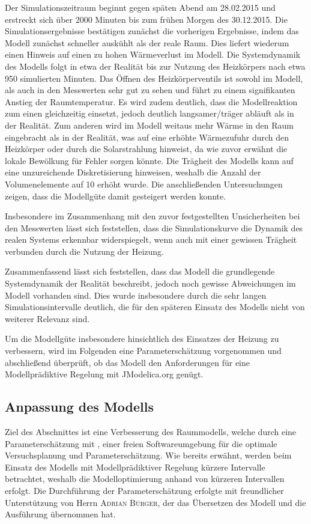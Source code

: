 Der Simulationszeitraum beginnt gegen späten Abend am 28.02.2015 und erstreckt sich über 2000 Minuten bis zum frühen Morgen des 30.12.2015. Die Simulationsergebnisse bestätigen zunächst die vorherigen Ergebnisse, indem das Modell zunächst schneller auskühlt als der reale Raum. Dies liefert wiederum einen Hinweis auf einen zu hohen Wärmeverlust im Modell.
Die Systemdynamik des Modells folgt in etwa der Realität bis zur Nutzung des Heizkörpers nach etwa 950 simulierten Minuten. 
Das Öffnen des Heizkörperventils ist sowohl im Modell, als auch in den Messwerten sehr gut zu sehen und führt zu einem signifikanten Anstieg der Raumtemperatur. Es wird zudem deutlich, dass die Modellreaktion zum einen gleichzeitig einsetzt, jedoch deutlich langsamer/träger abläuft als in der Realität. Zum anderen wird im Modell weitaus mehr Wärme in den Raum eingebracht als in der Realität, was auf eine erhöhte Wärmezufuhr durch den Heizkörper oder durch die Solarstrahlung hinweist, da wie zuvor erwähnt die lokale Bewölkung für Fehler sorgen könnte.
Die Trägheit des Modells kann auf eine unzureichende Diskretisierung hinweisen, weshalb die Anzahl der Volumenelemente auf 10 erhöht wurde. Die anschließenden Untersuchungen zeigen, dass die Modellgüte damit gesteigert werden konnte.

Insbesondere im Zusammenhang mit den zuvor festgestellten Unsicherheiten bei den Messwerten lässt sich feststellen, dass die  Simulationskurve die Dynamik des realen Systems erkennbar widerspiegelt, wenn auch mit einer gewissen Trägheit verbunden durch die Nutzung der Heizung.

Zusammenfassend lässt sich feststellen, dass das Modell die grundlegende Systemdynamik der Realität beschreibt, jedoch noch gewisse Abweichungen im Modell vorhanden sind. Dies wurde insbesondere durch die sehr langen Simulationsintervalle deutlich, die für den späteren Einsatz des Modells nicht von weiterer Relevanz sind.

 Um die Modellgüte insbesondere hinsichtlich des Einsatzes der Heizung zu verbessern, wird im Folgenden eine Parameterschätzung vorgenommen und abschließend überprüft, ob das Modell den Anforderungen für eine Modellprädiktive Regelung mit JModelica.org genügt.


\subsection{Anpassung des Modells}
Ziel des Abschnittes ist eine Verbesserung des Raummodells, welche durch eine Parameterschätzung mit \cite{casiopeia}, einer freien Softwareumgebung für die optimale Versuchsplanung und Parameterschätzung.
Wie bereits erwähnt, werden beim Einsatz des Modells mit Modellprädiktiver Regelung kürzere Intervalle betrachtet, weshalb die Modelloptimierung anhand von kürzeren Intervallen erfolgt. Die Durchführung der Parameterschätzung erfolgte mit freundlicher Unterstützung von Herrn \textsc{Adrian Bürger}, der das Übersetzen des Modell und die Ausführung übernommen hat.

